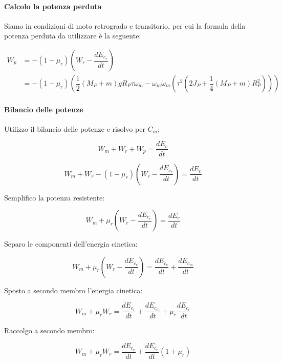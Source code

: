 \documentclass[main.tex]{subfiles}
\begin{document}
\paragraph{Calcolo la potenza perduta} Siamo in condizioni di moto retrogrado e transitorio, per cui la formula della potenza perduta da utilizzare è la seguente:

\begin{align*}
	W_p &= -(1-\mu_r)(W_r - \dfrac{dE_{c_r}}{dt}) \\
	&= -(1-\mu_r)(\dfrac{1}{2}(M_P + m)gR_P\tau\omega_m - \omega_m\dot{\omega}_m(\tau^2(2J_P + \dfrac{1}{4}(M_P + m)R_P^2)))
\end{align*}

\paragraph{Bilancio delle potenze} Utilizzo il bilancio delle potenze e risolvo per $C_m$:

\begin{equation}
	W_m + W_r + W_p = \dfrac{dE_c}{dt}
\end{equation}

\begin{equation}
	W_m + W_r -(1-\mu_r)(W_r - \dfrac{dE_{c_r}}{dt}) = \dfrac{dE_c}{dt}
\end{equation}

Semplifico la potenza resistente:

\begin{equation}
	W_m + \mu_r(W_r - \dfrac{dE_{c_r}}{dt}) = \dfrac{dE_c}{dt}
\end{equation}

Separo le componenti dell'energia cinetica:

\begin{equation}
	W_m + \mu_r(W_r - \dfrac{dE_{c_r}}{dt}) = \dfrac{dE_{c_r}}{dt} + \dfrac{dE_{c_m}}{dt}
\end{equation}

Sposto a secondo membro l'energia cinetica:

\begin{equation}
	W_m + \mu_rW_r = \dfrac{dE_{c_r}}{dt} + \dfrac{dE_{c_m}}{dt} + \mu_r\dfrac{dE_{c_r}}{dt}
\end{equation}

Raccolgo a secondo membro:

\begin{equation}
	W_m + \mu_rW_r = \dfrac{dE_{c_r}}{dt} + \dfrac{dE_{c_r}}{dt}(1+\mu_r)
\end{equation}
\end{document}

